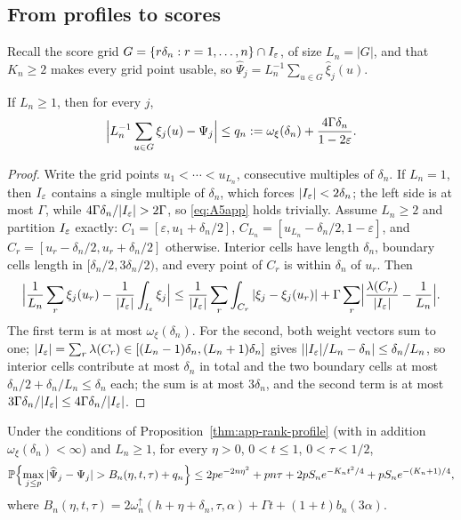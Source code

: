 \subsection{From profiles to scores}\label{app:scores}

Recall the score grid $G=\{r\delta_n:r=1,\ldots,n\}\cap I_\varepsilon$, of size
$L_n=|G|$, and that $K_n\ge2$ makes every grid point usable, so
$\widehat\Psi_j=L_n^{-1}\sum_{u\in G}\widehat\xi_j(u)$.

\begin{lemma}[Quadrature]\label{lem:app-quadrature}
If $L_n\ge1$, then for every $j$,
\begin{equation}
 \Bigl|L_n^{-1}\sum_{u\in G}\xi_j(u)-\Psi_j\Bigr|
 \le q_n:=\omega_\xi(\delta_n)+\frac{4\Gamma\delta_n}{1-2\varepsilon}.
 \label{eq:A5app}
\end{equation}
\end{lemma}

\begin{proof}
Write the grid points $u_1<\cdots<u_{L_n}$, consecutive multiples of
$\delta_n$.  If $L_n=1$, then $I_\varepsilon$ contains a single multiple of
$\delta_n$, which forces $|I_\varepsilon|<2\delta_n$; the left side is at most
$\Gamma$, while $4\Gamma\delta_n/|\I|>2\Gamma$, so \eqref{eq:A5app}
holds trivially.  Assume $L_n\ge2$ and partition $I_\varepsilon$
exactly: $C_1=[\varepsilon,u_1+\delta_n/2]$,
$C_{L_n}=[u_{L_n}-\delta_n/2,1-\varepsilon]$, and
$C_r=[u_r-\delta_n/2,u_r+\delta_n/2]$ otherwise.  Interior cells have
length $\delta_n$, boundary cells length in $[\delta_n/2,3\delta_n/2)$,
and every point of $C_r$ is within $\delta_n$ of $u_r$.  Then
\[
 \Bigl|\frac1{L_n}\sum_r\xi_j(u_r)-\frac1{|I_\varepsilon|}\int_{I_\varepsilon}\xi_j\Bigr|
 \le\frac1{|I_\varepsilon|}\sum_r\int_{C_r}|\xi_j-\xi_j(u_r)|
 +\Gamma\sum_r\Bigl|\frac{\lambda(C_r)}{|I_\varepsilon|}-\frac1{L_n}\Bigr|.
\]
The first term is at most $\omega_\xi(\delta_n)$.  For the second, both
weight vectors sum to one;
$|I_\varepsilon|=\sum_r\lambda(C_r)\in[(L_n-1)\delta_n,(L_n+1)\delta_n]$ gives
$||I_\varepsilon|/L_n-\delta_n|\le\delta_n/L_n$, so interior cells contribute at most
$\delta_n$ in total and the two boundary cells at most
$\delta_n/2+\delta_n/L_n\le\delta_n$ each; the sum is at most $3\delta_n$,
and the second term is at most $3\Gamma\delta_n/|I_\varepsilon|\le
4\Gamma\delta_n/|I_\varepsilon|$.
\end{proof}

\begin{proposition}\label{thm:app-score}
Under the conditions of Proposition~\ref{thm:app-rank-profile} (with in
addition $\omega_\xi(\delta_n)<\infty$) and $L_n\ge1$, for every
$\eta>0$, $0<t\le1$, $0<\tau<1/2$,
\begin{align}
 \mathbb P\Bigl\{\max_{j\le p}|\widehat\Psi_j-\Psi_j|
 >B_n(\eta,t,\tau)+q_n\Bigr\}
 \le
 2pe^{-2n\eta^2}+pn\tau+2pS_ne^{-K_nt^2/4}+pS_ne^{-(K_n+1)/4},
 \label{eq:A6app}
\end{align}
where
$B_n(\eta,t,\tau)=2\omega_n^{\uparrow}(h+\eta+\delta_n,\tau,\alpha)+\Gamma t
+(1+t)b_n(3\alpha)$.
\end{proposition}

